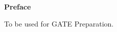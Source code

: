 \thispagestyle{empty}
        \begin{flushleft}
                \fontsize{5cm}{1em}\textbf{Preface}
        \end{flushleft}
        \vspace{2.5cm}
          To be used for GATE Preparation.
\null